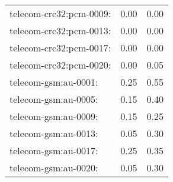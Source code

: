 \begin{longtable}{lrr}
telecom-crc32:pcm-0009: & 0.00 & 0.00 \\
telecom-crc32:pcm-0013: & 0.00 & 0.00 \\
telecom-crc32:pcm-0017: & 0.00 & 0.00 \\
telecom-crc32:pcm-0020: & 0.00 & 0.05 \\
telecom-gsm:au-0001: & 0.25 & 0.55 \\
telecom-gsm:au-0005: & 0.15 & 0.40 \\
telecom-gsm:au-0009: & 0.15 & 0.25 \\
telecom-gsm:au-0013: & 0.05 & 0.30 \\
telecom-gsm:au-0017: & 0.25 & 0.35 \\
telecom-gsm:au-0020: & 0.05 & 0.30 \\
\end{longtable}
